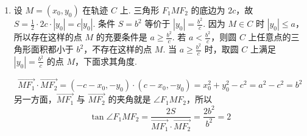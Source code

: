 \begin{problem}
\begin{solution}
\begin{enumerate}
\item 设 \(M=(x_0,y_0)\) 在轨迹 \(C\) 上. 三角形 \(F_1MF_2\) 的底边为 \(2c\)，故
\(S=\frac12\cdot2c\cdot|y_0|=c|y_0|\). 条件 \(S=b^2\) 等价于 \(|y_0|=\frac{b^2}{c}\). 因为 \(M\in C\) 时 \(|y_0|\leqslant a\)，所以存在这样的点 \(M\) 的充要条件是 \(a\geqslant\frac{b^2}{c}\).
若 \(a<\frac{b^2}{c}\)，则圆 \(C\) 上任意点的三角形面积都小于 \(b^2\)，不存在这样的点 \(M\). 当 \(a\geqslant\frac{b^2}{c}\) 时，取圆 \(C\) 上满足 \(|y_0|=\frac{b^2}{c}\) 的点 \(M\)，下面求其角度.

\[
\overrightarrow{MF_1}\cdot\overrightarrow{MF_2}
=(-c-x_0,-y_0)\cdot(c-x_0,-y_0)
=x_0^2+y_0^2-c^2
=a^2-c^2=b^2
\]
另一方面，\(\overrightarrow{MF_1}\) 与 \(\overrightarrow{MF_2}\) 的夹角就是 \(\angle F_1MF_2\)，所以
\[
\tan\angle F_1MF_2
=\frac{2S}{\overrightarrow{MF_1}\cdot\overrightarrow{MF_2}}
=\frac{2b^2}{b^2}=2
\]
\end{enumerate}
\end{solution}
\end{problem}

